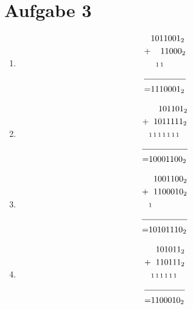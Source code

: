 \documentclass{scrreprt}
\begin{document}
    \section{Aufgabe 3}
    \begin{enumerate}[label = (\alph*)]
        \item 
            \begin{align*}
                & {1011001}_2 \\
                + & \hspace{0.4cm} {11000}_2  \\
                & \hspace{0.2cm} {\scriptstyle 1\, 1} \\
                \cline{1-2} 
                = &{1110001}_2  
            \end{align*}
        \item 
            \begin{align*}
                & \hspace{0.4cm} {101101}_2  \\
                + & \hspace{0.2cm} {1011111}_2  \\
                & {\scriptstyle1\, 1\, 1\, 1\, 1\, 1\, 1} \\
                \cline{1-2} 
                = &{10001100}_2  
            \end{align*}
        \item 
            \begin{align*}
                & \hspace{0.2cm} {1001100}_2  \\
                + & \hspace{0.2cm} {1100010}_2  \\
                &  {\scriptstyle 1} \\
                \cline{1-2} 
                = &{10101110}_2  
            \end{align*}
        \item 
            \begin{align*}
                & \hspace{0.2cm} {101011}_2  \\
                + & \hspace{0.2cm} {110111}_2  \\
                & {\scriptstyle1\, 1 \, 1 \, 1 \, 1 \, 1}\\
                \cline{1-2} 
                = &{1100010}_2  
            \end{align*}
    \end{enumerate}
\end{document}
